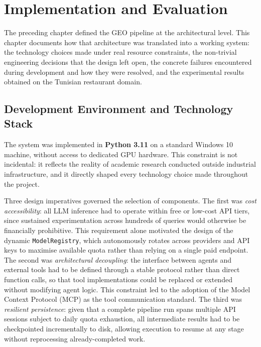 \chapter{Implementation and Evaluation}
\label{chap:impl}

The preceding chapter defined the GEO pipeline at the architectural level.
This chapter documents how that architecture was translated into a working system:
the technology choices made under real resource constraints, the non-trivial
engineering decisions that the design left open, the concrete failures encountered
during development and how they were resolved, and the experimental results
obtained on the Tunisian restaurant domain.

\section{Development Environment and Technology Stack}
\label{sec:devenv}

The system was implemented in \textbf{Python 3.11} on a standard Windows 10 machine,
without access to dedicated GPU hardware. This constraint is not incidental: it reflects
the reality of academic research conducted outside industrial infrastructure, and it
directly shaped every technology choice made throughout the project.

Three design imperatives governed the selection of components.
The first was \textit{cost accessibility}: all LLM inference had to operate within
free or low-cost API tiers, since sustained experimentation across hundreds of queries
would otherwise be financially prohibitive. This requirement alone motivated the design
of the dynamic \texttt{ModelRegistry}, which autonomously rotates across providers and
API keys to maximise available quota rather than relying on a single paid endpoint.
The second was \textit{architectural decoupling}: the interface between agents and
external tools had to be defined through a stable protocol rather than direct function
calls, so that tool implementations could be replaced or extended without modifying
agent logic. This constraint led to the adoption of the Model Context Protocol (MCP)
as the tool communication standard.
The third was \textit{resilient persistence}: given that a complete pipeline run spans
multiple API sessions subject to daily quota exhaustion, all intermediate results had
to be checkpointed incrementally to disk, allowing execution to resume at any stage
without reprocessing already-completed work.


